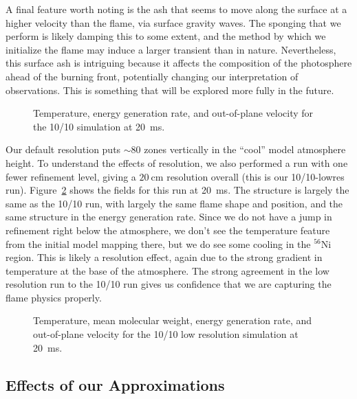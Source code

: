 \documentclass[preprint,times,tighten]{aastex63}
\newcommand{\isot}[2]{$^{#2}\mathrm{#1}$}
\begin{document}
A final feature worth noting is the ash that seems to move along the
surface at a higher velocity than the flame, via surface gravity
waves.  The sponging that we perform is likely damping this to some extent, and
the method by which we initialize the flame may induce a larger
transient than in nature. Nevertheless, this surface ash is intriguing
because it affects the composition of the photosphere ahead of the
burning front, potentially changing our interpretation of
observations.  This is something that will be explored more fully in
the future.

\begin{figure}[t]
\centering
{}
\caption{\label{fig:10_10_overview} Temperature, energy generation rate, and out-of-plane velocity for the 10/10 simulation at 20~ms.}
\end{figure}


Our default resolution puts $\sim 80$ zones vertically in the
``cool''  model atmosphere height.  To
understand the effects of resolution, we also performed a run with one
fewer refinement level, giving a $20~\mbox{cm}$ resolution overall (this is our
10/10-lowres run).  Figure~\ref{fig:10_10_lowres} shows the fields for this run at
20~ms.  The structure is largely the same as the 10/10 run, with
largely the same flame shape and position, and the same structure in
the energy generation rate.  Since we do not have a jump in refinement
right below the atmosphere, we don't see the temperature feature from
the initial model mapping there, but we do see some cooling in the
\isot{Ni}{56} region.  This is likely a resolution effect, again due
to the strong gradient in temperature at the base of the atmosphere.
The strong agreement in the low resolution run to the 10/10 run gives
us confidence that we are capturing the flame physics properly.

\begin{figure}[t]
\centering
{}
\caption{\label{fig:10_10_lowres} Temperature, mean molecular weight,
  energy generation rate, and out-of-plane velocity for the 10/10 low
  resolution simulation at 20~ms.}
\end{figure}




\subsection{Effects of our Approximations}
\end{document}
